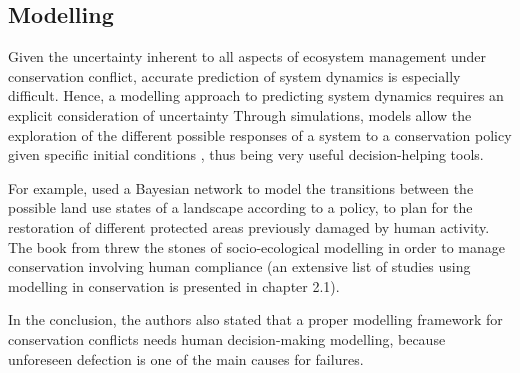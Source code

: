 \documentclass[12pt,a4paper]{article}
\begin{document}
\subsection{Modelling}

Given the uncertainty inherent to all aspects of ecosystem management under conservation conflict, accurate prediction of system dynamics is especially difficult.
Hence, a modelling approach to predicting system dynamics requires an explicit consideration of uncertainty
Through simulations, models allow the exploration of the different possible responses of a system to a conservation policy given specific initial conditions
, thus being very useful decision-helping tools.
%

For example, \cite{rumpff2011state} used a Bayesian network to model the transitions between the possible land use states of a landscape according to a policy, to plan for the restoration of different protected areas previously damaged by human activity.
The book from \cite{schluter2012new} threw the stones of socio-ecological modelling in order to manage conservation involving human compliance (an extensive list of studies using modelling in conservation is presented in chapter 2.1).

In the conclusion, the authors also stated that a proper modelling framework for conservation conflicts needs human decision-making modelling, because unforeseen defection is one of the main causes for failures.\\
%
\end{document}
